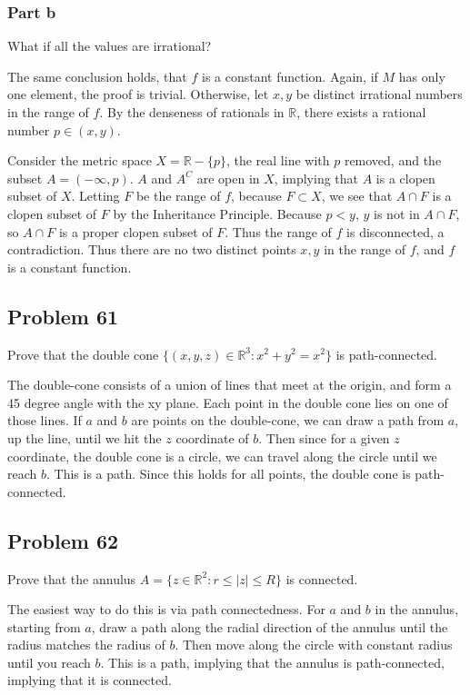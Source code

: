 \documentclass{article}
\newcommand{\R}{\mathbb{R}}
\begin{document}
\subsubsection*{Part b}

What if all the values are irrational?

The same conclusion holds, that $f$ is a constant function. Again, if $M$ has only one element, the proof is trivial. Otherwise, let $x, y$ be distinct irrational numbers in the range of $f$. By the denseness of rationals in $\R$, there exists a rational number $p \in (x, y)$.

Consider the metric space $X = \R - \{p\}$, the real line with $p$ removed, and the subset $A = (-\infty, p)$. $A$ and $A^C$ are open in $X$, implying that $A$ is a clopen subset of $X$. Letting $F$ be the range of $f$, because $F \subset X$, we see that $A \cap F$ is a clopen subset of $F$ by the Inheritance Principle. Because $p < y$, $y$ is not in $A \cap F$, so $A \cap F$ is a proper clopen subset of $F$. Thus the range of $f$ is disconnected, a contradiction. Thus there are no two distinct points $x, y$ in the range of $f$, and $f$ is a constant function.

\subsection*{Problem 61}

Prove that the double cone $\{(x, y, z) \in \R^3: x^2 + y^2 = x^2\}$ is path-connected.

The double-cone consists of a union of lines that meet at the origin, and form a 45 degree angle with the xy plane. Each point in the double cone lies on one of those lines. If $a$ and $b$ are points on the double-cone, we can draw a path from $a$, up the line, until we hit the $z$ coordinate of $b$. Then since for a given $z$ coordinate, the double cone is a circle, we can travel along the circle until we reach $b$. This is a path. Since this holds for all points, the double cone is path-connected.

\subsection*{Problem 62}

Prove that the annulus $A = \{z \in \R^2: r \leq |z| \leq R\}$ is connected.

The easiest way to do this is via path connectedness. For $a$ and $b$ in the annulus, starting from $a$, draw a path along the radial direction of the annulus until the radius matches the radius of $b$. Then move along the circle with constant radius until you reach $b$. This is a path, implying that the annulus is path-connected, implying that it is connected.
\end{document}

